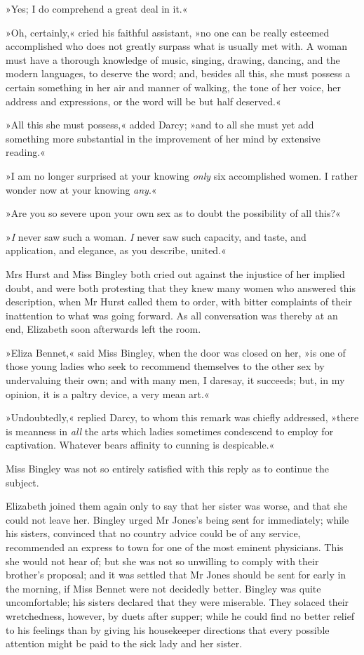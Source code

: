 »Yes; I do comprehend a great deal in it.«

»Oh, certainly,« cried his faithful assistant, »no one can be really esteemed accomplished who does not greatly surpass what is usually met with. A woman must have a thorough knowledge of music, singing, drawing, dancing, and the modern languages, to deserve the word; and, besides all this, she must possess a certain something in her air and manner of walking, the tone of her voice, her address and expressions, or the word will be but half deserved.«

»All this she must possess,« added Darcy; »and to all she must yet add something more substantial in the improvement of her mind by extensive reading.«

»I am no longer surprised at your knowing \textit{only} six accomplished women. I rather wonder now at your knowing \textit{any}.«

»Are you so severe upon your own sex as to doubt the possibility of all this?«

»\textit{I} never saw such a woman. \textit{I} never saw such capacity, and taste, and application, and elegance, as you describe, united.«

Mrs Hurst and Miss Bingley both cried out against the injustice of her implied doubt, and were both protesting that they knew many women who answered this description, when Mr Hurst called them to order, with bitter complaints of their inattention to what was going forward. As all conversation was thereby at an end, Elizabeth soon afterwards left the room.

»Eliza Bennet,« said Miss Bingley, when the door was closed on her, »is one of those young ladies who seek to recommend themselves to the other sex by undervaluing their own; and with many men, I daresay, it succeeds; but, in my opinion, it is a paltry device, a very mean art.«

»Undoubtedly,« replied Darcy, to whom this remark was chiefly addressed, »there is meanness in \textit{all} the arts which ladies sometimes condescend to employ for captivation. Whatever bears affinity to cunning is despicable.«

Miss Bingley was not so entirely satisfied with this reply as to continue the subject.

Elizabeth joined them again only to say that her sister was worse, and that she could not leave her. Bingley urged Mr Jones's being sent for immediately; while his sisters, convinced that no country advice could be of any service, recommended an express to town for one of the most eminent physicians. This she would not hear of; but she was not so unwilling to comply with their brother's proposal; and it was settled that Mr Jones should be sent for early in the morning, if Miss Bennet were not decidedly better. Bingley was quite uncomfortable; his sisters declared that they were miserable. They solaced their wretchedness, however, by duets after supper; while he could find no better relief to his feelings than by giving his housekeeper directions that every possible attention might be paid to the sick lady and her sister.